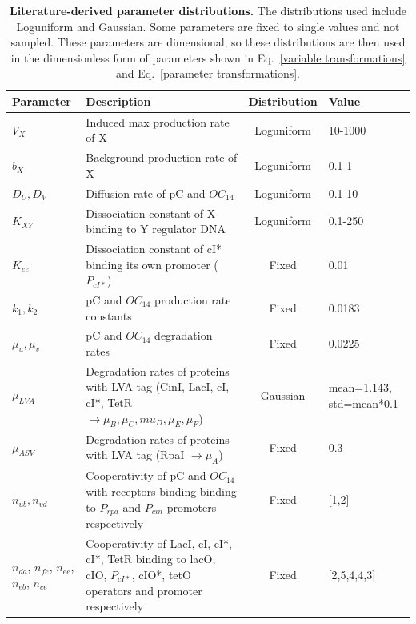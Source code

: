 \begin{table}[H]
    \caption{\textbf{Literature-derived parameter distributions.} The distributions used include Loguniform and Gaussian. Some parameters are fixed to single values and not sampled. These parameters are dimensional, so these distributions are then used in the dimensionless form of parameters shown in Eq.~\ref{variable transformations} and Eq.~\ref{parameter transformations}.}
\label{tab:literature param distributions}
\renewcommand{\arraystretch}{1.3} %
\begin{tabular}{|p{20mm}|p{57mm}|c|p{25mm}|}
\hline
\textbf{Parameter} & \textbf{Description} & \textbf{Distribution} & \textbf{Value}\\
\hline

$V_{X}$ & Induced max production rate of X & Loguniform &  10-1000 \\
\hline
$b_{X}$ & Background production rate of X & Loguniform & 0.1-1\\
\hline
$D_{U}, D_{V}$ & Diffusion rate of pC and $OC_{14}$ & Loguniform & 0.1-10\\
\hline
$K_{XY}$ & Dissociation constant of X binding to Y regulator DNA & Loguniform & 0.1-250\\
\hline
$K_{ee}$ & Dissociation constant of cI* binding its own promoter ($P_{cI*}$) & Fixed & 0.01\\
\hline
$k_{1},k_{2}$ & pC and $OC_{14}$ production rate constants  & Fixed & 0.0183\\
\hline
$\mu_{u},\mu_{v}$ & pC and $OC_{14}$ degradation rates & Fixed & 0.0225\\
\hline
$\mu_{LVA}$ & Degradation rates of proteins with LVA tag (CinI, LacI, cI, cI*, TetR $\rightarrow \mu_{B}, \mu_{C}, mu_{D}, \mu_{E}, \mu_{F}$) & Gaussian & mean=1.143, std=mean*0.1\\
\hline
$\mu_{ASV}$ & Degradation rates of proteins with LVA tag (RpaI $\rightarrow \mu_{A}$) & Fixed & 0.3\\
\hline
$n_{ub}, n_{vd}$ & Cooperativity of pC and $OC_{14}$ with receptors binding binding to $P_{rpa}$ and $P_{cin}$ promoters respectively & Fixed & [1,2]\\
\hline
$n_{da}$, $n_{fe}$, $n_{ee}$, $n_{eb}$, $n_{ce}$ & Cooperativity of LacI, cI, cI*, cI*, TetR binding to lacO, cIO, $P_{cI*}$, cIO*, tetO operators and promoter respectively & Fixed & [2,5,4,4,3]\\
\hline
\end{tabular}
\end{table}

